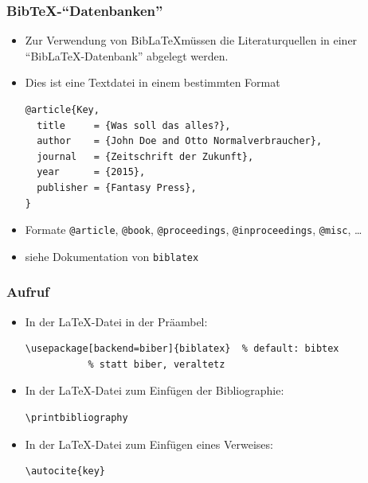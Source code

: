 \begin{frame}[fragile]
  \frametitle{Bib\TeX-\enquote{Datenbanken}}

  \begin{itemize}
  \item<+-> Zur Verwendung von Bib\LaTeX müssen die Literaturquellen in
    einer \enquote{Bib\LaTeX-Datenbank} abgelegt werden.
  \item<+-> Dies ist eine Textdatei in einem bestimmten Format\onslide<+->%
\begin{lstlisting}
@article{Key,
  title     = {Was soll das alles?},
  author    = {John Doe and Otto Normalverbraucher},
  journal   = {Zeitschrift der Zukunft},
  year      = {2015},
  publisher = {Fantasy Press},
}
\end{lstlisting}
  \item<+-> Formate \verb|@article|, \verb|@book|, \verb|@proceedings|,
    \verb|@inproceedings|, \verb|@misc|, \dots
  \item<+-> siehe Dokumentation von \lstinline|biblatex|
  \end{itemize}

\end{frame}

\begin{frame}[fragile]
  \frametitle{Aufruf}

  \begin{itemize}
  \item<+-> In der \LaTeX-Datei in der Präambel:
\begin{lstlisting}
\usepackage[backend=biber]{biblatex}  % default: bibtex
           % statt biber, veraltetz
\end{lstlisting}
  \item<+-> In der \LaTeX-Datei zum Einfügen der Bibliographie:
\begin{lstlisting}
\printbibliography
\end{lstlisting}
  \item<+-> In der \LaTeX-Datei zum Einfügen eines Verweises:
\begin{lstlisting}
\autocite{key}
\end{lstlisting}
\end{itemize}
\end{frame}

